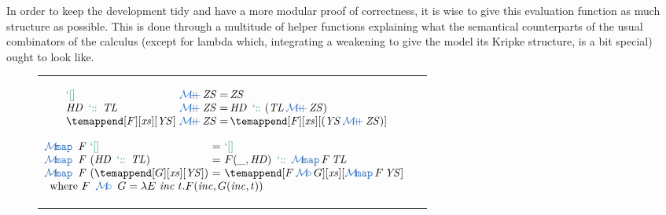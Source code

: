 \documentclass[preprint]{sigplanconf}
\begin{document}
In order to keep the development tidy and have a more modular proof of correctness,
it is wise to give this evaluation function as much structure as possible. This is
done through a multitude of helper functions explaining what the semantical
counterparts of the usual combinators of the calculus (except for lambda which,
integrating a weakening to give the model its Kripke structure, is a bit special)
ought to look like.
\begin{figure}
\small
\begin{tabular}{lr}
\begin{minipage}{0.45\textwidth}$$
\begin{array}{l@{~\vappend\mathit{ZS}=\,}l}
\tenil                          & \mathit{ZS} \\
\mathit{HD} \tecons \mathit{TL} & \mathit{HD} \tecons (\mathit{TL} \vappend \mathit{ZS}) \\
\temappend[F][\mathit{xs}][\mathit{YS}]
                                & \temappend[\mathit{F}][\mathit{xs}][(\mathit{YS} \vappend \mathit{ZS})]
\end{array}$$

$$\begin{array}{@{\vmap~\mathit{F}~}l@{~=~}l}
\tenil                          & \tenil \\
(\mathit{HD} \tecons \mathit{TL}) & F (\_, \mathit{HD}) \tecons \vmap F \, \mathit{TL} \\
(\temappend[G][\mathit{xs}][\mathit{YS}])
                                & \temappend[F \vcomp G][\mathit{xs}][\vmap F \, \mathit{YS}] \\
\multicolumn{2}{l}{\text{where}~ F ~\vcomp~ G = \lambda E~\mathit{inc}~t. F (\mathit{inc}, G(\mathit{inc},t))}
\end{array}$$


\end{minipage}
\end{tabular}
\end{figure}
\end{document}
